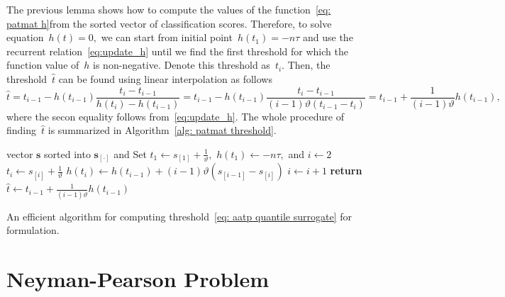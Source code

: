 The previous lemma shows how to compute the values of the function~\eqref{eq: patmat h}from the sorted vector of classification scores. Therefore, to solve equation~$h(t) = 0,$ we can start from initial point~$h(t_{1}) = -n\tau$ and use the recurrent relation~\eqref{eq:update_h} until we find the first threshold for which the function value of~$h$ is non-negative. Denote this threshold as~$t_{i}.$ Then, the threshold~$\hat{t}$ can be found using linear interpolation as follows
\begin{equation*}
  \hat{t}
    = t_{i-1} - h(t_{i - 1})\frac{t_{i} - t_{i-1}}{h(t_{i}) - h(t_{i-1})}
    = t_{i-1} - h(t_{i - 1})\frac{t_{i} - t_{i-1}}{(i - 1) \vartheta(t_{i - 1} - t_{i})}
    = t_{i-1} + \frac{1}{(i - 1)\vartheta} h(t_{i - 1}),
\end{equation*}
where the secon equality follows from~\eqref{eq:update_h}. The whole procedure of finding~$\hat{t}$ is summarized in Algorithm~\ref{alg: patmat threshold}.

\begin{algorithm}
  \centering
  \begin{algorithmic}[1]
    \Require vector $\bm{s}$ sorted into $\bm{s}_{[\cdot]}$ and 
    \State Set $t_1 \gets s_{[1]}  + \frac{1}{\vartheta},$ $h(t_1) \gets -n\tau,$ and $i \gets 2$
      \State $t_i \gets s_{[i]}  + \frac{1}{\vartheta}$
      \State $h(t_i) \gets h(t_{i - 1}) + (i - 1) \vartheta(s_{[i - 1]} - s_{[i]})$  
      \State $i \gets i + 1$
    \EndWhile
    \State \textbf{return} $\hat{t} \gets t_{i-1} + \frac{1}{(i - 1)\vartheta} h(t_{i - 1})$
  \end{algorithmic}
  \caption{An efficient algorithm for computing threshold~\eqref{eq: aatp quantile surrogate} for \PatMat formulation.}
  \label{alg: patmat threshold}
\end{algorithm}

\section{Neyman-Pearson Problem}\label{sec: Neyman-Pearson}

